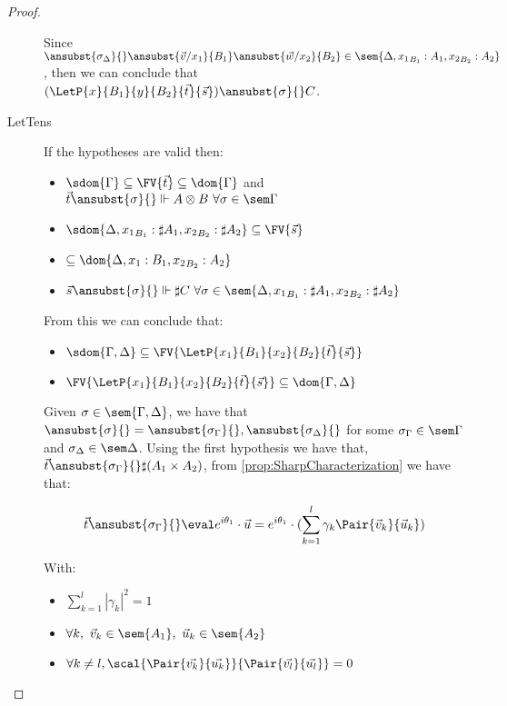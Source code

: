 \begin{proof}
\begin{description}
    Since $\ansubst{\sigma_\Delta}{}\ansubst{\vec{v}/x_1}{B_1}\ansubst{\vec{w}/x_2}{B_2}\in\sem{\Delta,{x_1}_{B_1}:A_1,{x_2}_{B_2}:A_2}$, then we can conclude that $(\LetP{x}{B_1}{y}{B_2}{\vec{t}}{\vec{s}})\ansubst{\sigma}{}\real C$.

    \item[LetTens] If the hypotheses are valid then:
    \begin{itemize}
        \item $\sdom{\Gamma}\subseteq \FV{\vec t} \subseteq \dom{\Gamma}$ and $\vec t \ansubst{\sigma}{}\Vdash A\otimes B\ \forall \sigma\in\sem\Gamma$
        \item $\sdom{\Delta, {x_1}_{B_1}:\sharp A_1, {x_2}_{B_2}:\sharp A_2}\subseteq \FV{\vec s}$
        \item $\subseteq \dom{\Delta,{x_1}:{B_1}, {x_2}_{B_2}:A_2}$
        \item $\vec s \ansubst{\sigma}{}\Vdash \sharp C\ \forall \sigma\in\sem{\Delta, {x_1}_{B_1}:\sharp A_1, {x_2}_{B_2}:\sharp A_2}$
    \end{itemize}
    
    From this we can conclude that:
    \begin{itemize}
        \item $\sdom{\Gamma,\Delta}\subseteq\FV{\LetP{x_1}{B_1}{x_2}{B_2}{\vec{t}}{\vec{s}}}$
        \item $\FV{\LetP{x_1}{B_1}{x_2}{B_2}{\vec{t}}{\vec{s}}}\subseteq\dom{\Gamma,\Delta}$
    \end{itemize}
    
    Given $\sigma\in\sem{\Gamma,\Delta}$, we have that $\ansubst{\sigma}{}=\ansubst{\sigma_\Gamma}{},\ansubst{\sigma_\Delta}{}$ for some $\sigma_\Gamma\in\sem\Gamma$ and $\sigma_\Delta\in\sem\Delta$. Using the first hypothesis we have that, $\vec t\ansubst{\sigma_\Gamma}{}\real \sharp(A_1\times A_2)$, from \ref{prop:SharpCharacterization} we have that:
    
    \[\vec t\ansubst{\sigma_\Gamma}{}\eval e^{i\theta_1}\cdot\vec{u}=e^{i\theta_1}\cdot(\sum_{k=1}^{l} \gamma_k \Pair{\vec v_k}{\vec u_k})\] 
    
    With:
    \begin{itemize}
        \item $\sum_{k=1}^{l} |\gamma_k|^2 = 1$
        \item $\forall k,\ \vec v_k\in\sem{A_1},\ \vec u_k\in\sem{A_2}$
        \item $\forall k\neq l, \scal{\Pair{\vec{v_k}}{\vec{u_k}}}{\Pair{\vec{v_l}}{\vec{u_l}}}= 0$
    \end{itemize}
    

\end{description}
\end{proof}
